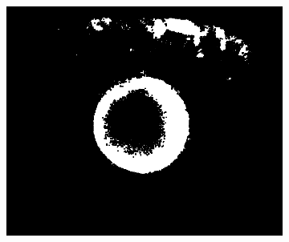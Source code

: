 \documentclass{article}
\begin{document}
\begin{figure}[H]
\begin{subfigure}{.09\textwidth}
  \label{fig:arrow}
\end{subfigure}%
\begin{subfigure}{.47\textwidth}
  \centering
  \includegraphics[width=0.97\linewidth]{_Figures/raw_data_3_closure.png}
  \caption{}
  \label{fig:raw_3_closure}
\end{subfigure}



\end{figure}
\end{document}

